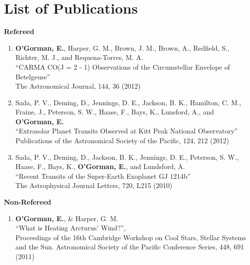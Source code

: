 \chapter{List of Publications}
\label{chapter:publications}


{\large \textbf{Refereed}}

\begin{enumerate}

\item \textbf{O'Gorman, E.}, Harper, G. M., Brown, J. M., Brown, A., Redfield, S., Richter, M. J., and Requena-Torres, M. A.\\
``CARMA CO(J = 2 - 1) Observations of the Circumstellar Envelope of Betelgeuse''\\
The Astronomical Journal, 144, 36 (2012)

\item Sada, P. V., Deming, D., Jennings, D. E., Jackson, B. K., Hamilton, C. M., Fraine, J., Peterson, S. W., Haase, F., Bays, K., Lunsford, A., and \textbf{O'Gorman, E.}\\
``Extrasolar Planet Transits Observed at Kitt Peak National Observatory''\\
Publications of the Astronomical Society of the Pacific, 124, 212 (2012)

\item Sada, P. V., Deming, D., Jackson, B. K., Jennings, D. E., Peterson, S. W., Haase, F., Bays, K., \textbf{O'Gorman, E.}, and Lundsford, A.\\
``Recent Transits of the Super-Earth Exoplanet GJ 1214b''\\
The Astrophysical Journal Letters, 720, L215 (2010)
\end{enumerate}


\begin{flushleft}
{\large \textbf{Non-Refereed}}
\end{flushleft}

\begin{enumerate}
\item \textbf{O'Gorman, E.}, \& Harper, G. M.\\
``What is Heating Arcturus' Wind?'', \\
Proceedings of the 16th Cambridge Workshop on Cool Stars, Stellar Systems and the Sun. 
Astronomical Society of the Pacific Conference Series, 448, 691 (2011)
\end{enumerate}

